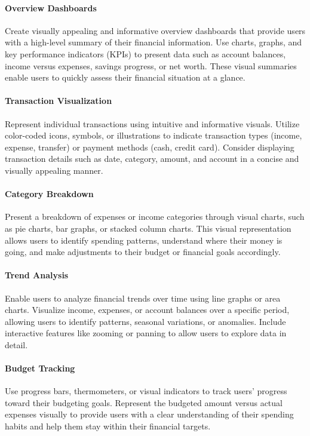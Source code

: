 \paragraph{Overview Dashboards}
Create visually appealing and informative overview dashboards that provide users with a high-level summary of their financial information. Use charts, graphs, and key performance indicators (KPIs) to present data such as account balances, income versus expenses, savings progress, or net worth. These visual summaries enable users to quickly assess their financial situation at a glance.

\paragraph{Transaction Visualization}
Represent individual transactions using intuitive and informative visuals. Utilize color-coded icons, symbols, or illustrations to indicate transaction types (income, expense, transfer) or payment methods (cash, credit card). Consider displaying transaction details such as date, category, amount, and account in a concise and visually appealing manner.

\paragraph{Category Breakdown}
Present a breakdown of expenses or income categories through visual charts, such as pie charts, bar graphs, or stacked column charts. This visual representation allows users to identify spending patterns, understand where their money is going, and make adjustments to their budget or financial goals accordingly.

\paragraph{Trend Analysis}
Enable users to analyze financial trends over time using line graphs or area charts. Visualize income, expenses, or 
account balances over a specific period, allowing users to identify patterns, seasonal variations, or anomalies. 
Include interactive features like zooming or panning to allow users to explore data in detail.

\paragraph{Budget Tracking}
Use progress bars, thermometers, or visual indicators to track users' progress toward their budgeting goals. Represent 
the budgeted amount versus actual expenses visually to provide users with a clear understanding of their spending 
habits and help them stay within their financial targets.

